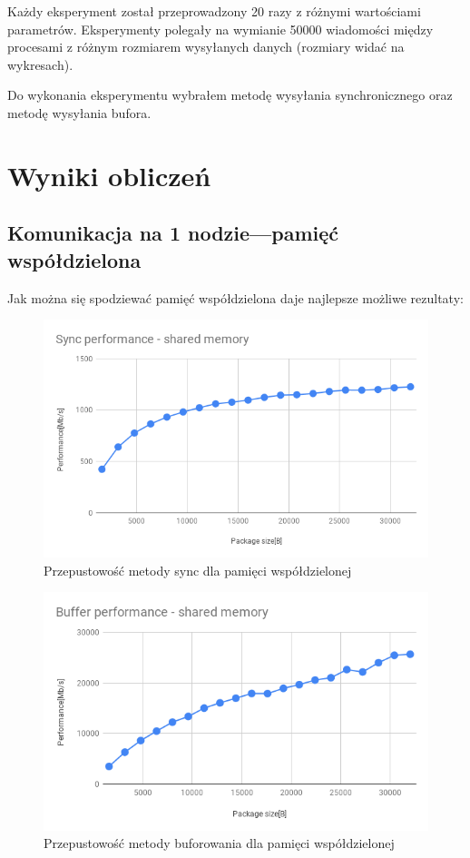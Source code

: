 \documentclass[11pt]{article}
\begin{document}
    Każdy eksperyment został przeprowadzony 20 razy z różnymi wartościami parametrów.
    Eksperymenty polegały na wymianie 50000 wiadomości między procesami z różnym rozmiarem wysyłanych danych
    (rozmiary widać na wykresach).

    Do wykonania eksperymentu wybrałem metodę wysyłania synchronicznego oraz metodę wysyłania bufora.

    \clearpage
    \section{Wyniki obliczeń}
    \subsection{Komunikacja na 1 nodzie---pamięć współdzielona}
    Jak można się spodziewać pamięć współdzielona daje najlepsze możliwe rezultaty:

    \renewcommand{\figurename}{Wykres}
    \begin{figure}[H]
        \includegraphics[width=1\textwidth,frame]{charts/Sync performance - shared memory.png}
        \caption{Przepustowość metody sync dla pamięci współdzielonej}
        \label{fig:sync-shared-performance}
    \end{figure}
    \begin{figure}[H]
        \includegraphics[width=1\textwidth,frame]{charts/Buffer performance - shared memory.png}
        \caption{Przepustowość metody buforowania dla pamięci współdzielonej}
        \label{fig:buff-shared-performance}
    \end{figure}
\end{document}
